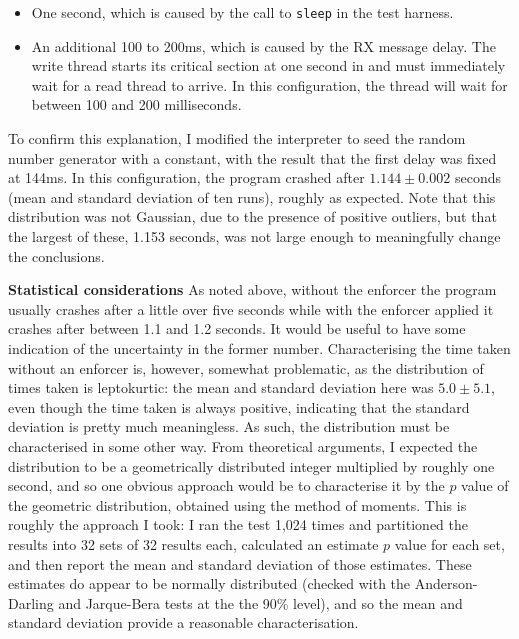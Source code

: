 \begin{itemize}
\item One second, which is caused by the call to \verb|sleep| in the
  test harness.
\item An additional 100 to 200ms, which is caused by the RX message
  delay.  The write thread starts its critical section at one second
  in and must immediately wait for a read thread to arrive.  In this
  configuration, the thread will wait for between 100 and 200
  milliseconds.
\end{itemize}

To confirm this explanation, I modified the interpreter to seed the
random number generator with a constant, with the result that the
first delay was fixed at 144ms.  In this configuration, the program
crashed after $1.144 \pm 0.002$ seconds (mean and standard deviation
of ten runs), roughly as expected.  Note that this distribution was
not Gaussian, due to the presence of positive outliers, but that the
largest of these, 1.153 seconds, was not large enough to meaningfully
change the conclusions.

\textbf{Statistical considerations} As noted above, without the
enforcer the program usually crashes after a little over five seconds
while with the enforcer applied it crashes after between 1.1 and 1.2
seconds.  It would be useful to have some indication of the
uncertainty in the former number.  Characterising the time taken
without an enforcer is, however, somewhat problematic, as the
distribution of times taken is leptokurtic: the mean and standard
deviation here was $5.0 \pm 5.1$,
even though the time taken is always positive, indicating that the
standard deviation is pretty much meaningless.  As such, the
distribution must be characterised in some other way.  From
theoretical arguments, I expected the distribution to be a
geometrically distributed integer multiplied by roughly one second,
and so one obvious approach would be to characterise it by the $p$
value of the geometric distribution, obtained using the method of
moments.  This is roughly the approach I took: I ran the test 1,024
times and partitioned the results into 32 sets of 32 results each,
calculated an estimate $p$ value for each set, and then report the
mean and standard deviation of those estimates.  These estimates do
appear to be normally distributed (checked with the Anderson-Darling
and Jarque-Bera tests at the the 90\% level), and so the mean and
standard deviation provide a reasonable characterisation.

